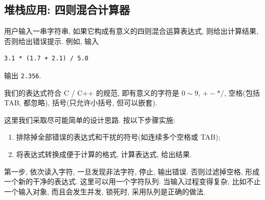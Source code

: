 \documentclass[a4paper]{ctexart}
\theoremstyle{definition}
\theoremstyle{definition}
\begin{document}
\subsection{堆栈应用: 四则混合计算器}

用户输入一串字符串, 如果它构成有意义的四则混合运算表达式, 则给出计算结果, 
否则给出错误提示. 例如, 输入
\begin{verbatim}
3.1 * (1.7 + 2.1) / 5.0
\end{verbatim}
输出 \verb|2.356|. 

我们的表达式符合 C / C++ 的规范, 即有意义的字符是 $0 \sim 9$, $+ - *
/$, 空格(包括 TAB, 都忽略), 括号(只允许小括号, 但可以嵌套).

这里我们采取尽可能简单的设计思路. 按以下步骤实施:

\begin{enumerate}
\item 排除掉全部错误的表达式和干扰的符号(如连续多个空格或 TAB);
\item 将表达式转换成便于计算的格式, 计算表达式, 给出结果.
\end{enumerate}

第一步, 依次读入字符, 一旦发现非法字符, 停止, 输出错误. 否则过滤掉空格,
形成一个新的干净的表达式. 这里可以用一个字符队列. 当输入过程变得复杂,
比如不止一个输入对象, 而且会发生并发, 锁死时, 采用队列是正确的做法.
\end{document}
